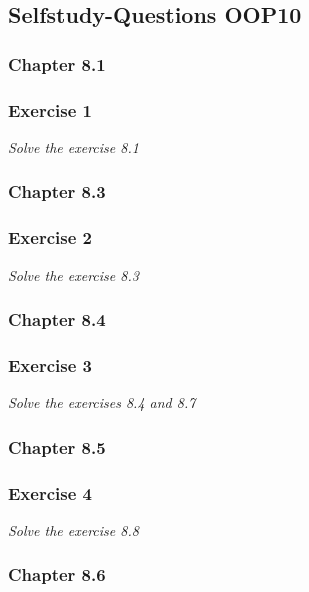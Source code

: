 \subsection{Selfstudy-Questions OOP10}

\subsubsection{Chapter 8.1}

\subsubsection*{Exercise 1}
\textit{Solve the exercise 8.1} \\

\subsubsection{Chapter 8.3}

\subsubsection*{Exercise 2}
\textit{Solve the exercise 8.3} \\

\subsubsection{Chapter 8.4}

\subsubsection*{Exercise 3}
\textit{Solve the exercises 8.4 and 8.7} \\

\subsubsection{Chapter 8.5}

\subsubsection*{Exercise 4}
\textit{Solve the exercise 8.8} \\

\subsubsection{Chapter 8.6}

